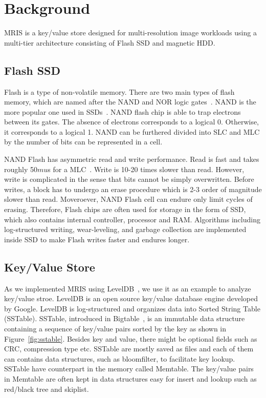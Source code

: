 \section{Background}
\label{sec:bg}

MRIS is a key/value store designed for multi-resolution image
workloads using a multi-tier architecture consisting of Flash SSD and
magnetic HDD.

\subsection{Flash SSD}
Flash is a type of non-volatile memory. There are two main types of
flash memory, which are named after the NAND and NOR logic
gates~\cite{flashwiki}. NAND is the more popular one used in
SSDs~\cite{ssdanatomy}.  NAND flash chip is able to trap electrons
between its gates. The absence of electrons corresponds to a logical
0. Otherwise, it corresponds to a logical 1. NAND can be furthered
divided into SLC and MLC by the number of bits can be represented in a
cell.

NAND Flash has asymmetric read and write performance. Read is fast and
takes roughly 50$mu$s for a MLC~\cite{ssdanatomy}. Write is 10-20
times slower than read. However, write is complicated in the sense
that bits cannot be simply overwritten. Before writes, a block has to
undergo an erase procedure which is 2-3 order of magnitude slower than
read. Moveroever, NAND Flash cell can endure only limit cycles of
erasing. Therefore, Flash chips are often used for storage in the form
of SSD, which also contains internal controller, processor and RAM.
Algorithms including log-structured writing, wear-leveling, and
garbage collection are implemented inside SSD to make Flash writes
faster and endures longer.

\subsection{Key/Value Store}
As we implemented MRIS using LevelDB~\cite{leveldb-web}, we use it as
an example to analyze key/value stroe. LevelDB is an open source
key/value database engine developed by Google. LevelDB is
log-structured and organizes data into Sorted String Table (SSTable).
SSTable, introduced in Bigtable~\cite{chang06osdi}, is an immutable
data structure containing a sequence of key/value pairs sorted by the
key as shown in Figure~\ref{fig:sstable}. Besides key and value, there
might be optional fields such as CRC, compression type etc. SSTable
are mostly saved as files and each of them can contains data
structures, such as bloomfilter, to facilitate key lookup. SSTable
have counterpart in the memory called Memtable. The key/value pairs in
Memtable are often kept in data structures easy for insert and lookup
such as red/black tree and skiplist.

